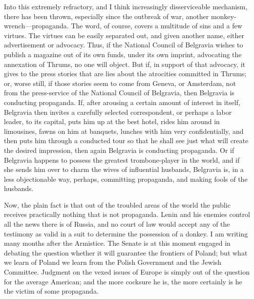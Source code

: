 \documentclass[openany,nobib,nohyper]{tufte-book}
\begin{document}
Into this extremely refractory, and I think increasingly disserviceable
mechanism, there has been thrown, especially since the outbreak of war,
another monkey-wrench---propaganda. The word, of course, covers a
multitude of sins and a few virtues. The virtues can be easily separated
out, and given another name, either advertisement or advocacy. Thus, if
the National Council of Belgravia wishes to publish a magazine out of
its own funds, under its own imprint, advocating the annexation of
Thrums, no one will object. But if, in support of that advocacy, it
gives to the press stories that are lies about the atrocities committed
in Thrums; or, worse still, if those stories seem to come from Geneva,
or Amsterdam, not from the press-service of the National Council of
Belgravia, then Belgravia is conducting propaganda. If, after arousing a
certain amount of interest in itself, Belgravia then invites a carefully
selected correspondent, or perhaps a labor leader, to its capital, puts
him up at the best hotel, rides him around in limousines, fawns on him
at banquets, lunches with him very confidentially, and then puts him
through a conducted tour so that he shall see just what will create the
desired impression, then again Belgravia is conducting propaganda. Or if
Belgravia happens to possess the greatest trombone-player in the world,
and if she sends him over to charm the wives of influential husbands,
Belgravia is, in a less objectionable way, perhaps, committing
propaganda, and making fools of the husbands.

Now, the plain fact is that out of the troubled areas of the world the
public receives practically nothing that is not propaganda. Lenin and
his enemies control all the news there is of Russia, and no court of law
would accept any of the testimony as valid in a suit to determine the
possession of a donkey. I am writing many months after the Armistice.
The Senate is at this moment engaged in debating the question whether it
will guarantee the frontiers of Poland; but what we learn of Poland we
learn from the Polish Government and the Jewish Committee. Judgment on
the vexed issues of Europe is simply out of the question for the average
American; and the more cocksure he is, the more certainly is he the
victim of some propaganda.
\end{document}
